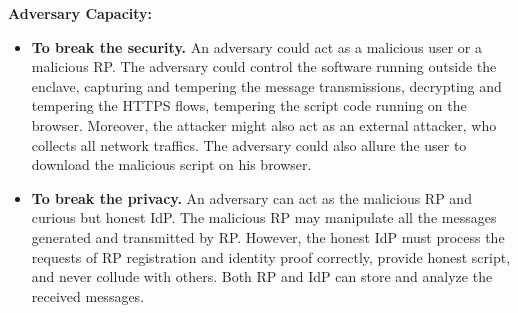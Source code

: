 \vspace{1mm}\noindent\textbf{Adversary Capacity: }
\begin{itemize}
\item \noindent\textbf{To break the security.}
An adversary could act as a malicious user or a malicious RP.
The adversary could control the software running outside the enclave, capturing and tempering the message transmissions, decrypting and tempering the HTTPS flows, tempering the script code running on the browser.
Moreover, the attacker might also act as an external attacker,
    who collects all network traffics. The adversary could also allure the user to download the malicious script on his browser.

\item \noindent\textbf{To break the privacy.}
An adversary can act as the malicious RP and curious but honest IdP.
The malicious RP may manipulate  all the messages generated and transmitted by RP.
However, the honest IdP must process the requests of RP registration and identity proof correctly, provide honest script, and never collude with others.
Both RP and IdP can store and analyze the received messages.

\end{itemize}

